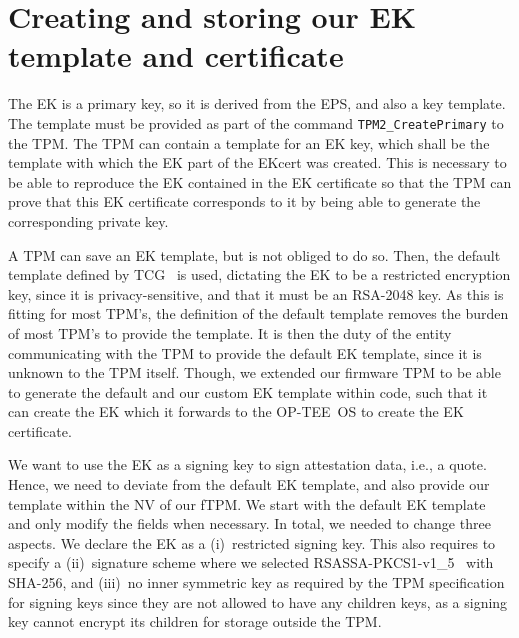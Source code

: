 \section{Creating and storing our EK template and certificate}

The EK is a primary key, so it is derived from the EPS, and also a key template.
The template must be provided as part of the command \texttt{TPM2\_CreatePrimary} to the TPM\@.
The TPM can contain a template for an EK key, which shall be the template with which the EK part of the EKcert was created.
This is necessary to be able to reproduce the EK contained in the EK certificate so that the TPM can prove that this EK certificate corresponds to it by being able to generate the corresponding private key.

A TPM can save an EK template, but is not obliged to do so.
Then, the default template defined by TCG~\cite{tcg-ek} is used, dictating the \ac{EK} to be a restricted encryption key, since it is privacy-sensitive, and that it must be an RSA-2048 key.
As this is fitting for most TPM's, the definition of the default template removes the burden of most TPM's to provide the template.
It is then the duty of the entity communicating with the TPM to provide the default EK template, since it is unknown to the TPM itself.
Though, we extended our firmware TPM to be able to generate the default and our custom EK template within code, such that it can create the EK which it forwards to the OP-TEE~OS to create the EK certificate.


We want to use the EK as a signing key to sign attestation data, i.e., a quote.
Hence, we need to deviate from the default EK template, and also provide our template within the NV of our fTPM\@.
We start with the default EK template and only modify the fields when necessary.
In total, we needed to change three aspects.
We declare the EK as a (i)~restricted signing key.
This also requires to specify a (ii)~signature scheme where we selected RSASSA-PKCS1-v1\_5~\cite{Jonsson2003} with SHA-256, and (iii)~no inner symmetric key as required by the TPM specification~\cite{tpm20} for signing keys since they are not allowed to have any children keys, as a signing key cannot encrypt its children for storage outside the TPM\@.

